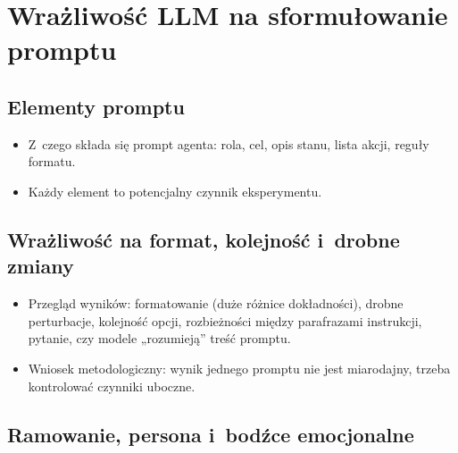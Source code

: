 
\chapter{Wrażliwość LLM na sformułowanie promptu}
\label{ch:prompt}


\section{Elementy promptu}
\label{sec:3-1}

\begin{planroboczy}[ok. 1 s.]
\begin{itemize}
  \item Z~czego składa się prompt agenta: rola, cel, opis stanu, lista akcji, reguły formatu.
  \item Każdy element to potencjalny czynnik eksperymentu.
\end{itemize}

\end{planroboczy}

\section{Wrażliwość na format, kolejność i~drobne zmiany}
\label{sec:3-2}

\begin{planroboczy}[ok. 2 s.]
\begin{itemize}
  \item Przegląd wyników: formatowanie (duże różnice dokładności), drobne perturbacje, kolejność opcji, rozbieżności między parafrazami instrukcji, pytanie, czy modele „rozumieją” treść promptu.
  \item Wniosek metodologiczny: wynik jednego promptu nie jest miarodajny, trzeba kontrolować czynniki uboczne.
\end{itemize}

\end{planroboczy}

\section{Ramowanie, persona i~bodźce emocjonalne}
\label{sec:3-3}

